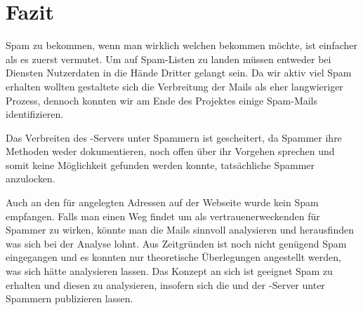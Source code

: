 \documentclass[a4paper,11pt,singlespacing]{article}
\begin{document}
\newpage


\section{Fazit}\label{sec:Fazit}
	Spam zu bekommen, wenn man wirklich welchen bekommen möchte, ist einfacher als es zuerst vermutet.
	Um auf Spam-Listen zu landen müssen entweder bei Diensten Nutzerdaten in die Hände Dritter gelangt sein.
	Da wir aktiv viel Spam erhalten wollten gestaltete sich die Verbreitung der Mails als eher langwieriger Prozess, dennoch konnten wir am Ende des Projektes einige Spam-Mails identifizieren.

	Das Verbreiten des -Servers unter Spammern ist gescheitert, da Spammer ihre Methoden weder dokumentieren, noch offen über ihr Vorgehen sprechen und somit keine Möglichkeit gefunden werden konnte, tatsächliche Spammer anzulocken.

	Auch an den für  angelegten Adressen auf der Webseite wurde kein Spam empfangen.
	Falls man einen Weg findet um als vertrauenerweckenden  für Spammer zu wirken, könnte man die Mails sinnvoll analysieren und herausfinden was sich bei der Analyse lohnt.
	Aus Zeitgründen ist noch nicht genügend Spam eingegangen und es konnten nur theoretische Überlegungen angestellt werden, was sich hätte analysieren lassen.
	Das Konzept an sich ist geeignet Spam zu erhalten und diesen zu analysieren, insofern sich die  und der -Server unter Spammern publizieren lassen.

\newpage




\newpage


\listoffigures
{}
\newpage
\end{document}
